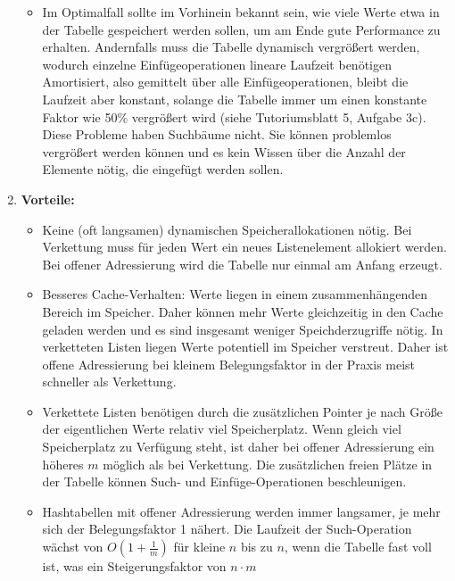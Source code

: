 \documentclass[11pt,a4paper]{article}
\begin{document}
\begin{loesung}
\begin{enumerate}
\begin{itemize}
            \item Im Optimalfall sollte im Vorhinein bekannt sein, wie viele Werte etwa in der Tabelle gespeichert werden sollen, um am Ende gute Performance zu erhalten.
            Andernfalls muss die Tabelle dynamisch vergrößert werden, wodurch einzelne Einfügeoperationen lineare Laufzeit benötigen
            Amortisiert, also gemittelt über alle Einfügeoperationen, bleibt die Laufzeit aber konstant, solange die Tabelle immer um einen konstante Faktor wie 50\% vergrößert wird (siehe Tutoriumsblatt 5, Aufgabe 3c).
            Diese Probleme haben Suchbäume nicht.
            Sie können problemlos vergrößert werden können und es kein Wissen über die Anzahl der Elemente nötig, die eingefügt werden sollen.
        \end{itemize}
        \item
        \textbf{Vorteile:}
        \begin{itemize}
            \item Keine (oft langsamen) dynamischen Speicherallokationen nötig.
            Bei Verkettung muss für jeden Wert ein neues Listenelement allokiert werden.
            Bei offener Adressierung wird die Tabelle nur einmal am Anfang erzeugt.
            \item Besseres Cache-Verhalten: Werte liegen in einem zusammenhängenden Bereich im Speicher.
            Daher können mehr Werte gleichzeitig in den Cache geladen werden und es sind insgesamt weniger Speichderzugriffe nötig.
            In verketteten Listen liegen Werte potentiell im Speicher verstreut.
            Daher ist offene Adressierung bei kleinem Belegungsfaktor in der Praxis meist schneller als Verkettung.
            \item Verkettete Listen benötigen durch die zusätzlichen Pointer je nach Größe der eigentlichen Werte relativ viel Speicherplatz.
            Wenn gleich viel Speicherplatz zu Verfügung steht, ist daher bei offener Adressierung ein höheres $m$ möglich als bei Verkettung.
            Die zusätzlichen freien Plätze in der Tabelle können Such- und Einfüge-Operationen beschleunigen.
        \end{itemize}
        \begin{itemize}
            \item Hashtabellen mit offener Adressierung werden immer langsamer, je mehr sich der Belegungsfaktor 1 nähert.
            Die Laufzeit der Such-Operation wächst von $O(1 + \frac{1}{m})$ für kleine $n$ bis zu $n$, wenn die Tabelle fast voll ist, was ein Steigerungsfaktor von $n \cdot m$

\end{itemize}
\end{enumerate}
\end{loesung}
\end{document}
